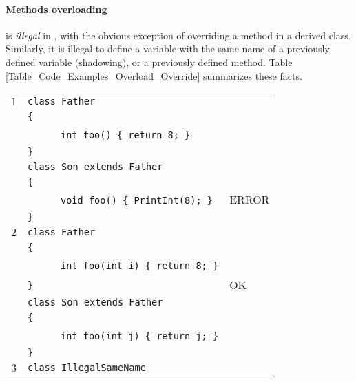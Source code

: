 \documentclass{article}
\begin{document}
\paragraph{Methods overloading} is \textit{illegal} in \plname,
with the obvious exception of overriding a method in a derived class.
Similarly, it is illegal to define a variable with the same name of
a previously defined variable (shadowing), or a previously defined method.
Table \ref{Table_Code_Examples_Overload_Override} summarizes these facts.
\begin{table}[h]
\centering
\begin{tabular}{|l|l|l|}
\hline
 $1$ & \verb"class Father"                       &       \\
     & \verb"{"                                  &       \\
     & ~ ~ ~ ~\verb"int foo() { return 8; }"     &       \\
     & \verb"}"                                  &       \\
     & \verb"class Son extends Father"           &       \\
     & \verb"{"                                  &       \\
     & ~ ~ ~ ~\verb"void foo() { PrintInt(8); }" & ERROR \\
     & \verb"}"                                  &       \\
\hline
 $2$ & \verb"class Father"                        &    \\
     & \verb"{"                                   &    \\
     & ~ ~ ~ ~\verb"int foo(int i) { return 8; }" &    \\
     & \verb"}"                                   & OK \\
     & \verb"class Son extends Father"            &    \\
     & \verb"{"                                   &    \\
     & ~ ~ ~ ~\verb"int foo(int j) { return j; }" &    \\
     & \verb"}"                                   &    \\
\hline
 $3$ & \verb"class IllegalSameName"                   &       \\

\end{tabular}
\end{table}
\end{document}
